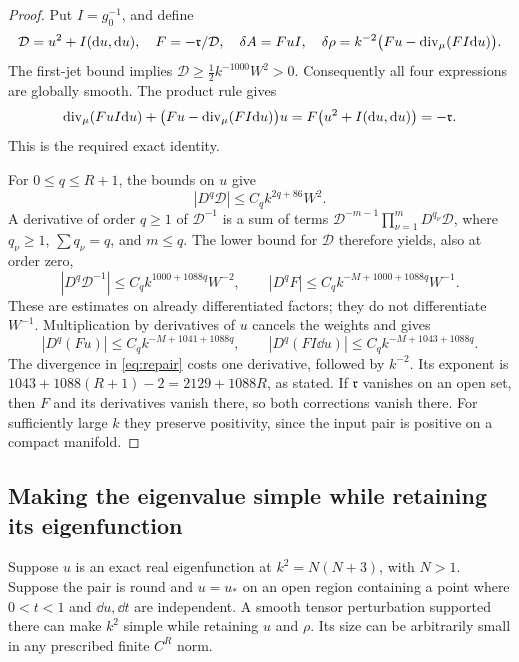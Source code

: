 \begin{proof}
Put \(I=g_0^{-1}\), and define
\begin{equation}\label{eq:repair}
 \mathcal D=u^2+I(\mathrm d u,\mathrm d u),\quad
 F=-\mathfrak r/\mathcal D,\quad
 \delta A=FuI,\quad
 \delta\rho=k^{-2}\bigl(Fu-\operatorname{div}_\mu(FI\mathrm d u)\bigr).
\end{equation}
The first-jet bound implies
\(\mathcal D\ge \tfrac12 k^{-1000}W^2>0\).
Consequently all four expressions are globally smooth. The product rule
gives
\[
 \operatorname{div}_\mu(FuI\mathrm d u)
   +\bigl(Fu-\operatorname{div}_\mu(FI\mathrm d u)\bigr)u
     =F\bigl(u^2+I(\mathrm d u,\mathrm d u)\bigr)=-\mathfrak r.
\]
This is the required exact identity.

For \(0\le q\le R+1\), the bounds on \(u\) give
\[
 |D^q\mathcal D|\le C_q k^{2q+86}W^2.
\]
A derivative of order \(q\ge1\) of \(\mathcal D^{-1}\) is a sum
of terms
\(\mathcal D^{-m-1}\prod_{\nu=1}^m D^{q_\nu}\mathcal D\),
where \(q_\nu\ge1\), \(\sum q_\nu=q\), and \(m\le q\).
The lower bound for \(\mathcal D\) therefore yields, also at order zero,
\[
 |D^q\mathcal D^{-1}|
    \le C_q k^{1000+1088q}W^{-2},\qquad
 |D^qF|\le C_q k^{-M+1000+1088q}W^{-1}.
\]
These are estimates on already differentiated factors; they do not
differentiate \(W^{-1}\).
Multiplication by derivatives of \(u\) cancels the weights and gives
\[
 |D^q(Fu)|\le C_qk^{-M+1041+1088q},\qquad
 |D^q(FI\dd u)|\le C_qk^{-M+1043+1088q}.
\]
The divergence in \eqref{eq:repair} costs one derivative, followed
by \(k^{-2}\). Its exponent is
\(1043+1088(R+1)-2=2129+1088R\), as stated.
If \(\mathfrak r\) vanishes on an open set, then \(F\) and its
derivatives vanish there, so both corrections vanish there.
For sufficiently large \(k\) they preserve positivity, since the
input pair is positive on a compact manifold.
\end{proof}

\subsection{Making the eigenvalue simple while retaining its eigenfunction}

\begin{lemma}\label{lem:simple}
Suppose \(u\) is an exact real eigenfunction at \(k^2=N(N+3)\),
with \(N>1\). Suppose the pair is round and \(u=u_*\) on an open
region containing a point where \(0<t<1\) and \(\dd u,\dd t\)
are independent. A smooth tensor perturbation supported there can
make \(k^2\) simple while retaining \(u\) and \(\rho\).
Its size can be arbitrarily small in any prescribed finite \(C^R\) norm.
\end{lemma}

